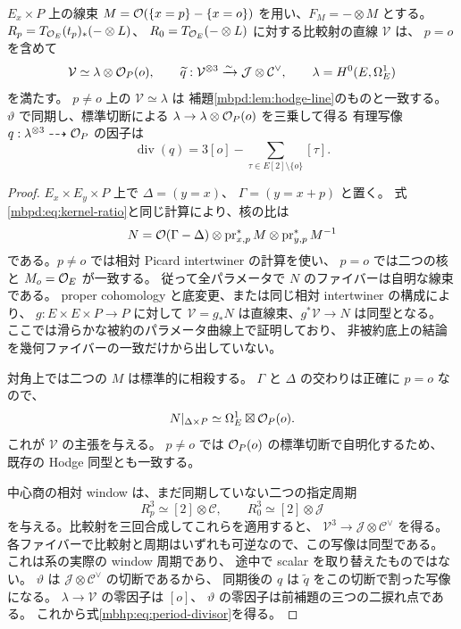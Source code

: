 \begin{lemma}[比較直線と同期前の三乗写像]
\label{mbhp:lem:global-comparison-line}
$E_x\times P$ 上の線束
$M=\mathcal O(\{x=p\}-\{x=o\})$ を用い、$F_M=-\otimes M$ とする。
$R_p=T_{\mathcal O_E}(t_p)_*(-\otimes L)$、
$R_0=T_{\mathcal O_E}(-\otimes L)$ に対する比較射の直線 $\mathcal V$ は、
$p=o$ を含めて
\begin{equation}\label{mbhp:eq:global-lines}
 \mathcal V\simeq\lambda\otimes\mathcal O_P(o),\qquad
 \widetilde q:\mathcal V^{\otimes3}
       \xrightarrow{\sim}\mathcal J\otimes\mathcal C^\vee,
 \qquad \lambda=H^0(E,\Omega_E^1)
\end{equation}
を満たす。
$p\ne o$ 上の $\mathcal V\simeq\lambda$ は
補題\ref{mbpd:lem:hodge-line}のものと一致する。
$\vartheta$ で同期し、標準切断による
$\lambda\to\lambda\otimes\mathcal O_P(o)$ を三乗して得る
有理写像 $q:\lambda^{\otimes3}\dashrightarrow\mathcal O_P$ の因子は
\begin{equation}\label{mbhp:eq:period-divisor}
 \operatorname{div}(q)=3[o]
       -\sum_{\tau\in E[2]\setminus\{o\}}[\tau].
\end{equation}
\end{lemma}
\begin{proof}
$E_x\times E_y\times P$ 上で $\Delta=(y=x)$、
$\Gamma=(y=x+p)$ と置く。
式\eqref{mbpd:eq:kernel-ratio}と同じ計算により、核の比は
\[
 N=\mathcal O(\Gamma-\Delta)\otimes
       \operatorname{pr}_{x,p}^*M\otimes
       \operatorname{pr}_{y,p}^*M^{-1}
\]
である。$p\ne o$ では相対 Picard intertwiner の計算を使い、
$p=o$ では二つの核と $M_o=\mathcal O_E$ が一致する。
従って全パラメータで $N$ のファイバーは自明な線束である。
proper cohomology と底変更、または同じ相対 intertwiner の構成により、
$g:E\times E\times P\to P$ に対して
$\mathcal V=g_*N$ は直線束、$g^*\mathcal V\to N$ は同型となる。
ここでは滑らかな被約のパラメータ曲線上で証明しており、
非被約底上の結論を幾何ファイバーの一致だけから出していない。

対角上では二つの $M$ は標準的に相殺する。
$\Gamma$ と $\Delta$ の交わりは正確に $p=o$ なので、
\[
 N|_{\Delta\times P}
     \simeq\Omega_E^1\boxtimes\mathcal O_P(o).
\]
これが $\mathcal V$ の主張を与える。
$p\ne o$ では $\mathcal O_P(o)$ の標準切断で自明化するため、
既存の Hodge 同型とも一致する。

中心商の相対 window は、まだ同期していない二つの指定周期
\[
 R_p^3\simeq[2]\otimes\mathcal C,\qquad
 R_0^3\simeq[2]\otimes\mathcal J
\]
を与える。比較射を三回合成してこれらを適用すると、
$\mathcal V^3\to\mathcal J\otimes\mathcal C^\vee$ を得る。
各ファイバーで比較射と周期はいずれも可逆なので、この写像は同型である。
これは系の実際の window 周期であり、
途中で scalar を取り替えたものではない。
$\vartheta$ は $\mathcal J\otimes\mathcal C^\vee$ の切断であるから、
同期後の $q$ は $\widetilde q$ をこの切断で割った写像になる。
$\lambda\to\mathcal V$ の零因子は $[o]$、
$\vartheta$ の零因子は前補題の三つの二捩れ点である。
これから式\eqref{mbhp:eq:period-divisor}を得る。
\end{proof}

